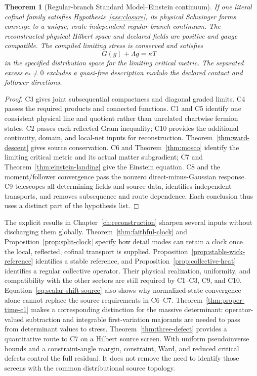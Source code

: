 \documentclass[11pt,a4paper,oneside]{book}
\theoremstyle{plain}
\newtheorem{theorem}{Theorem}[chapter]
\theoremstyle{definition}
\theoremstyle{remark}
\newcommand{\src}[2]{\cite{#1}}
\begin{document}
\begin{theorem}[Regular-branch Standard Model--Einstein continuum]
\label{thm:main}
If one literal cofinal family satisfies Hypothesis~\ref{ass:closure}, its physical Schwinger forms converge to a unique, route-independent regular-branch continuum. The reconstructed physical Hilbert space and declared fields are positive and gauge compatible. The compiled limiting stress is conserved and satisfies
\begin{equation}
 G(g)+\Lambda g=\kappa T
\end{equation}
in the specified distribution space for the limiting critical metric. The separated excess $e_*\ne0$ excludes a quasi-free description modulo the declared contact and follower directions.
\end{theorem}
\begin{proof}
C3 gives joint subsequential compactness and diagonal graded limits. C4 passes the required products and connected functions. C1 and C5 identify one consistent physical line and quotient rather than unrelated chartwise fermion states. C2 passes each reflected Gram inequality; C10 provides the additional continuity, domain, and local-net inputs for reconstruction. Theorem~\ref{thm:ward-descent} gives source conservation. C6 and Theorem~\ref{thm:mosco} identify the limiting critical metric and its actual matter subgradient; C7 and Theorem~\ref{thm:einstein-landing} give the Einstein equation. C8 and the moment/follower convergence pass the nonzero direct-minus-Gaussian response. C9 telescopes all determining fields and source data, identifies independent transports, and removes subsequence and route dependence. Each conclusion thus uses a distinct part of the hypothesis list.
\end{proof}
\src{R18}{thm:v18v51-conditional-closure}

The explicit results in Chapter~\ref{ch:reconstruction} sharpen several
inputs without discharging them globally.  Theorem~\ref{thm:faithful-clock}
and Proposition~\ref{prop:split-clock} specify how detail modes can retain
a clock once the local, reflected, cofinal transport is supplied.
Proposition~\ref{prop:stable-wick-reference} identifies a stable reference,
and Proposition~\ref{prop:collective-heat} identifies a regular collective
operator.  Their physical realization, uniformity, and compatibility
with the other sectors are still required by C1--C3, C9, and C10.
Equation~\eqref{eq:scalar-shift-source} also shows why normalized-state
convergence alone cannot replace the source requirements in C6--C7.
Theorem~\ref{thm:proper-time-c1} makes a corresponding distinction for
the massive determinant: operator-valued subtraction and integrable
first-variation majorants are needed to pass from determinant values to
stress.  Theorem~\ref{thm:three-defect} provides a quantitative route to
C7 on a Hilbert source screen.  With uniform pseudoinverse bounds and a
constraint-angle margin, constraint, Ward, and reduced critical defects
control the full residual.  It does not remove the need to identify those
screens with the common distributional source topology.
\end{document}
